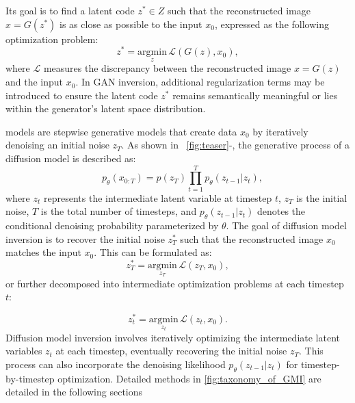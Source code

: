 Its goal is to find a latent code \(z^* \in Z\) such that the reconstructed image \(x = G(z^*)\) is as close as possible to the input \(x_0\), expressed as the following optimization problem:
\vspace{-0.2em}
\begin{equation}
z^* = \underset{z}{\mathrm{argmin}} \, \mathcal{L}(G(z), x_0),
\end{equation} 
\vspace{-0.2em}
where \( \mathcal{L} \) measures the discrepancy between the reconstructed image \(x = G(z)\) and the input \(x_0\). In GAN inversion, additional regularization terms may be introduced to ensure the latent code \(z^*\) remains semantically meaningful or lies within the generator's latent space distribution.

models are stepwise generative models that create data \(x_0\) by iteratively denoising an initial noise \(z_T\). As shown in ~\cref{fig:teaser}-\textbf{\uppercase\expandafter{}}, the generative process of a diffusion model is described as:  
\vspace{-0.5em}
\begin{equation}
\quad p_\theta(x_{0:T}) = p(z_T) \prod_{t=1}^T p_\theta(z_{t-1} | z_t),
\end{equation} 
where \(z_t\) represents the intermediate latent variable at timestep \(t\), \(z_T\) is the initial noise, \(T\) is the total number of timesteps, and \(p_\theta(z_{t-1} | z_t)\) denotes the conditional denoising probability parameterized by \(\theta\). 
The goal of diffusion model inversion is to recover the initial noise \(z_T^*\) such that the reconstructed image \(x_0\) matches the input \(x_0\). This can be formulated as:  
\vspace{-0.5em}
\begin{equation}
z_T^* = \underset{z_T}{\mathrm{argmin}} \, \mathcal{L}(z_T, x_0),
\end{equation}  
or further decomposed into intermediate optimization problems at each timestep \(t\):  

\begin{equation}
z_t^* = \underset{z_t}{\mathrm{argmin}} \, \mathcal{L}(z_t, x_0).
\end{equation}  
Diffusion model inversion involves iteratively optimizing the intermediate latent variables \(z_t\) at each timestep, eventually recovering the initial noise \(z_T\). This process can also incorporate the denoising likelihood \(p_\theta(z_{t-1} | z_t)\) for timestep-by-timestep optimization. 
Detailed methods in \cref{fig:taxonomy_of_GMI} are detailed in the following sections


